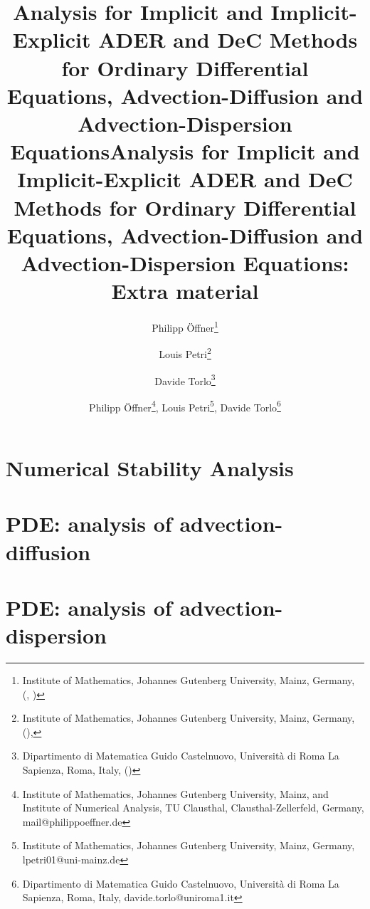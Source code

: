 \documentclass[USenglish]{article}
\title{Analysis for Implicit and Implicit-Explicit ADER and DeC Methods for Ordinary Differential Equations, Advection-Diffusion and Advection-Dispersion Equations}
\author{
	Philipp \"Offner\thanks{Institute of Mathematics, Johannes Gutenberg University, Mainz, Germany, (\email{poeffner@uni-mainz.de}, \orcid{0000-0002-1367-1917})
	} 
	\and 
	Louis Petri\thanks{Institute of Mathematics, Johannes Gutenberg University, Mainz, Germany, (\email{lpetri01@uni-mainz.de}), } 
	\and 
	Davide Torlo\thanks{Dipartimento di Matematica Guido Castelnuovo, Università di Roma La Sapienza,  Roma, Italy, (\email{davide.torlo@uniroma1.it})} 
}
\newcommand{\1}{\begin{pmatrix}
		1\\
		1
\end{pmatrix}}
\begin{document}
	\title{Analysis for Implicit and Implicit-Explicit ADER and DeC Methods for Ordinary Differential Equations, Advection-Diffusion and Advection-Dispersion Equations:\\ Extra material}
	
	\author{Philipp \"Offner\thanks{Institute of Mathematics, Johannes Gutenberg University, Mainz, and Institute of Numerical Analysis,  TU Clausthal, Clausthal-Zellerfeld, Germany, mail@philippoeffner.de},
	Louis Petri\thanks{Institute of Mathematics, Johannes Gutenberg University, Mainz, Germany, lpetri01@uni-mainz.de },  
	Davide Torlo\thanks{Dipartimento di Matematica Guido Castelnuovo, Università di Roma La Sapienza,  Roma, Italy, davide.torlo@uniroma1.it}
	}
	\date{}
	\maketitle
	
%			
	
	
	
	\section{Numerical Stability Analysis}
	\label{sec: stability_analysis_ODE}
	

	\section{PDE: analysis of advection-diffusion}
	\label{sec: advection_diffusion}
	 
	
	\section{PDE: analysis of advection-dispersion}
	\label{sec:PDE_adv_disp}
	 
	
%
%	 
	

	
\end{document}
